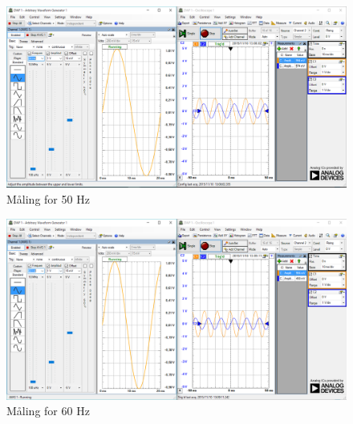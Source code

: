 \begin{figure}[H]
	\centering
	\includegraphics[width=1.0\textwidth]{Figurer/50Hz}
	\caption{Måling for 50 Hz}
	\label{fig:maeling50Hz}
\end{figure}

\begin{figure}[H]
	\centering
	\includegraphics[width=1.0\textwidth]{Figurer/60Hz}
	\caption{Måling for 60 Hz}
	\label{fig:maeling60Hz}
\end{figure}

